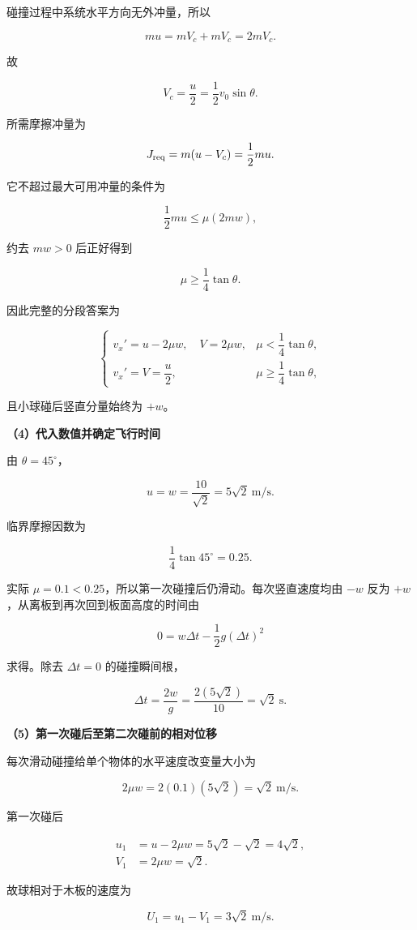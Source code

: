 \documentclass[12pt,a4paper,UTF8]{ctexart}
\begin{document}
碰撞过程中系统水平方向无外冲量，所以

\[mu=mV_c+mV_c=2mV_c.\]

故

\[V_c=\frac u2=\frac12v_0\sin\theta.\]

所需摩擦冲量为

\[J_{\rm req}=m(u-V_c)=\frac12mu.\]

它不超过最大可用冲量的条件为

\[\frac12mu\leq\mu(2mw),\]

约去 \(mw>0\) 后正好得到

\[\mu\geq\frac14\tan\theta.\]

因此完整的分段答案为

\[\boxed{
\begin{cases}
v_x'=u-2\mu w,\quad V=2\mu w,&\mu<\dfrac14\tan\theta,\\[6pt]
v_x'=V=\dfrac u2,&\mu\geq\dfrac14\tan\theta,
\end{cases}}
\]

且小球碰后竖直分量始终为 \(+w\)。

\textbf{（4）代入数值并确定飞行时间}

由 \(\theta=45^\circ\)，

\[u=w=\frac{10}{\sqrt2}=5\sqrt2\ \mathrm{m/s}.\]

临界摩擦因数为

\[\frac14\tan45^\circ=0.25.\]

实际 \(\mu=0.1<0.25\)，所以第一次碰撞后仍滑动。每次竖直速度均由 \(-w\)
反为 \(+w\)，从离板到再次回到板面高度的时间由

\[0=w\Delta t-\frac12g(\Delta t)^2\]

求得。除去 \(\Delta t=0\) 的碰撞瞬间根，

\[\Delta t=\frac{2w}{g}=\frac{2(5\sqrt2)}{10}=\sqrt2\ \mathrm s.\]

\textbf{（5）第一次碰后至第二次碰前的相对位移}

每次滑动碰撞给单个物体的水平速度改变量大小为

\[2\mu w=2(0.1)(5\sqrt2)=\sqrt2\ \mathrm{m/s}.\]

第一次碰后

\[\begin{aligned}
u_1&=u-2\mu w=5\sqrt2-\sqrt2=4\sqrt2,\\
V_1&=2\mu w=\sqrt2.
\end{aligned}\]

故球相对于木板的速度为

\[U_1=u_1-V_1=3\sqrt2\ \mathrm{m/s}.\]
\end{document}
